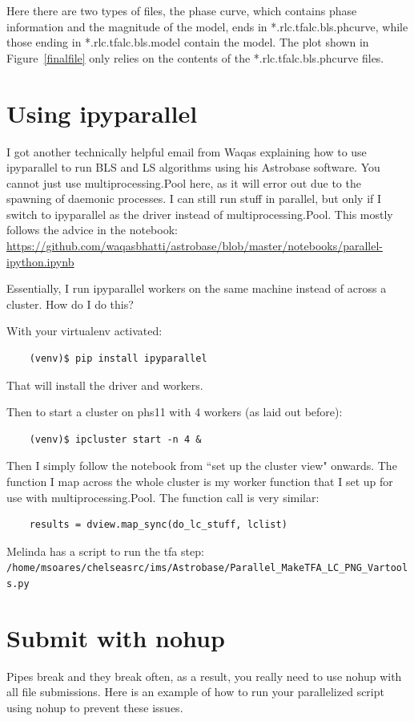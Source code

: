 Here there are two types of files, the phase curve, which contains phase information and the magnitude of the model, ends in *.rlc.tfalc.bls.phcurve, while those ending in *.rlc.tfalc.bls.model contain the model. The plot shown in Figure~\ref{finalfile} only relies on the contents of the *.rlc.tfalc.bls.phcurve files. 

\section*{Using ipyparallel}
I got another technically helpful email from Waqas explaining how to use ipyparallel to run BLS and LS algorithms using his Astrobase software. You cannot just use multiprocessing.Pool here, as it will error out due to the spawning of daemonic processes. 
I can still run stuff in parallel, but only if I switch
to ipyparallel as the driver instead of multiprocessing.Pool. This
mostly follows the advice in the notebook:
\url{https://github.com/waqasbhatti/astrobase/blob/master/notebooks/parallel-ipython.ipynb}

Essentially, I run ipyparallel workers on the same machine instead of across a cluster. How do I do this?

With your virtualenv activated:
\begin{verbatim}
    (venv)$ pip install ipyparallel
\end{verbatim}
That will install the driver and workers.

Then to start a cluster on phs11 with 4 workers (as laid out before):
\begin{verbatim}
    (venv)$ ipcluster start -n 4 &
\end{verbatim}

Then I simply follow the notebook from ``set up the cluster view" onwards.
The function I map across the whole cluster is my
worker function that I set up for use with multiprocessing.Pool. The function call is very similar:

\begin{verbatim}
    results = dview.map_sync(do_lc_stuff, lclist)
\end{verbatim}

 Melinda has a script to run the tfa step:    \texttt{/home/msoares/chelseasrc/ims/Astrobase/Parallel_MakeTFA_LC_PNG_Vartools.py}

\section*{Submit with nohup}
Pipes break and they break often, as a result, you really need to use nohup with all file submissions. Here is an example of how to run your parallelized script using nohup to prevent these issues.

